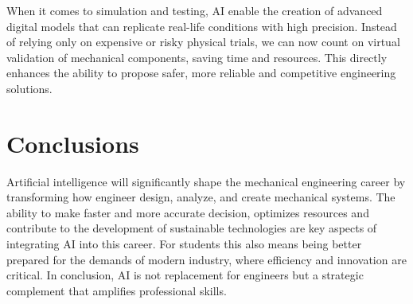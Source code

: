 \documentclass{article}
\begin{document}
When it comes to simulation and testing, AI enable the creation of advanced digital models that can replicate real-life conditions with high precision.
Instead of relying only on expensive or risky physical trials, we can now count on virtual validation of mechanical components, saving time and resources.
This directly enhances the ability to propose safer, more reliable and competitive engineering solutions.


\section*{Conclusions}

Artificial intelligence will significantly shape the mechanical engineering career by transforming how engineer design, analyze, and create mechanical systems.
The ability to make faster and more accurate decision, optimizes resources and contribute to the development of sustainable technologies are key aspects of integrating AI into this career.
For students this also means being better prepared for the demands of modern industry, where efficiency and innovation are critical.
In conclusion, AI is not replacement for engineers but a strategic complement that amplifies professional skills.

\newpage

\nocite{*}

\end{document}
